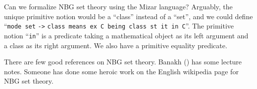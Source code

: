 \begin{puzzle}
Can we formalize NBG set theory using the Mizar language? Arguably, the
unique primitive notion would be a ``class'' instead of a ``set'', and
we could define ``\texttt{mode set} \verb|->| \texttt{class means ex C
  being class st it in C}''. The primitive notion ``\texttt{in}'' is a
predicate taking a mathematical object as its left argument and a class
as its right argument. We also have a primitive equality predicate.

There are few good references on NBG set theory. Banakh
() has some lecture notes. Someone has done some
heroic work on the English wikipedia page for NBG set theory.
\end{puzzle}
